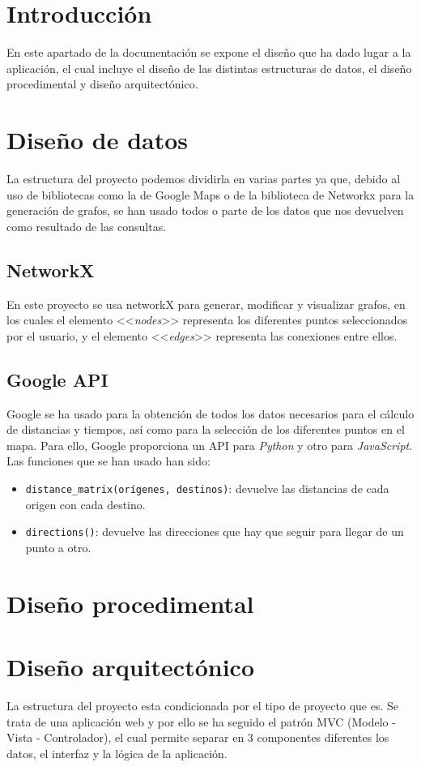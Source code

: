 
\section{Introducción}
En este apartado de la documentación se expone el diseño que ha dado lugar a la aplicación, el cual incluye el diseño de las distintas estructuras de datos, el diseño procedimental y diseño arquitectónico.

\section{Diseño de datos}
La estructura del proyecto podemos dividirla en varias partes ya que, debido al uso de bibliotecas como la de Google Maps o de la biblioteca de Networkx para la generación de grafos, se han usado todos o parte de los datos que nos devuelven como resultado de las consultas.

\subsection{NetworkX}
En este proyecto se usa networkX para generar, modificar y visualizar grafos, en los cuales el elemento <<\textit{nodes}>> representa los diferentes puntos seleccionados por el usuario, y el elemento <<\textit{edges}>> representa las conexiones entre ellos.

\subsection{Google API}
Google se ha usado para la obtención de todos los datos necesarios para el cálculo de distancias y tiempos, así como para la selección de los diferentes puntos en el mapa. Para ello, Google proporciona un API para \textit{Python} y otro para \textit{JavaScript}. Las funciones que se han usado han sido:
\begin{itemize}
	\item \texttt{distance\_matrix(orígenes, destinos)}: devuelve las distancias de cada origen con cada destino.
	\item \texttt{directions()}: devuelve las direcciones que hay que seguir para llegar de un punto a otro.
\end{itemize}


\section{Diseño procedimental}


\section{Diseño arquitectónico}

La estructura del proyecto esta condicionada por el tipo de proyecto que es. Se trata de una aplicación web y por ello se ha seguido el patrón MVC (Modelo - Vista - Controlador), el cual permite separar en 3 componentes diferentes los datos, el interfaz y la lógica de la aplicación. 
